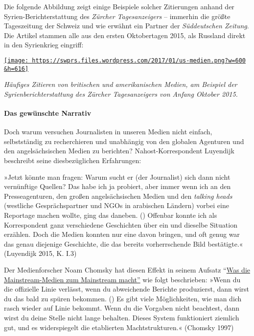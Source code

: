 Die folgende Abbildung zeigt einige Beispiele solcher Zitierungen anhand
der Syrien-Bericht­erstattung des \emph{Zürcher Tagesanzeigers} --
immerhin die größte Tageszeitung der Schweiz und wie erwähnt ein Partner
der \emph{Süddeutschen Zeitung}. Die Artikel stammen alle aus den ersten
Oktobertagen 2015, als Russland direkt in den Syrienkrieg eingriff:

\href{https://swprs.files.wordpress.com/2017/01/us-medien.png}{\texttt{[image: https://swprs.files.wordpress.com/2017/01/us-medien.png?w=600\\\&h=616]}}

\emph{Häufiges Zitieren von britischen und amerikanischen Medien, am
Beispiel der Syrien­berichterstattung des Zürcher Tagesanzeigers von
Anfang Oktober 2015.}

\hypertarget{das-gewuxfcnschte-narrativ}{%
\paragraph{Das gewünschte Narrativ}\label{das-gewuxfcnschte-narrativ}}

Doch warum versuchen Journalisten in unseren Medien nicht einfach,
selbstständig zu recherchieren und unabhängig von den globalen Agenturen
und den angel­sächsischen Medien zu berichten? Nahost-Korrespondent
Luyendijk beschreibt seine diesbezüglichen Erfahrungen:

»Jetzt könnte man fragen: Warum sucht er (der Journalist) sich dann
nicht vernünftige Quellen? Das habe ich ja probiert, aber immer wenn ich
an den Presseagenturen, den großen angel­sächsischen Medien und den
\emph{talking heads} (westliche Gesprächspartner und NGOs in arabischen
Ländern) vorbei eine Reportage machen wollte, ging das daneben. ()
Offenbar konnte ich als Korrespondent ganz verschiedene Geschichten über
ein und dieselbe Situation erzählen. Doch die Medien konnten nur eine
davon bringen, und oft genug war das genau diejenige Geschichte, die das
bereits vorherrschende Bild bestätigte.« (Luyendijk 2015, K. I.3)

Der Medienforscher Noam Chomsky hat diesen Effekt in seinem Aufsatz
``\href{https://chomsky.info/199710__/}{Was die Mainstream-Medien zum
Mainstream macht''} wie folgt beschrieben: »Wenn du die offizielle Linie
verlässt, wenn du abweichende Berichte produzierst, dann wirst du das
bald zu spüren bekommen. () Es gibt viele Möglichkeiten, wie man dich
rasch wieder auf Linie bekommt. Wenn du die Vorgaben nicht beachtest,
dann wirst du deine Stelle nicht lange behalten. Dieses System
funktioniert ziemlich gut, und es widerspiegelt die etablierten
Machtstrukturen.« (Chomsky 1997)

